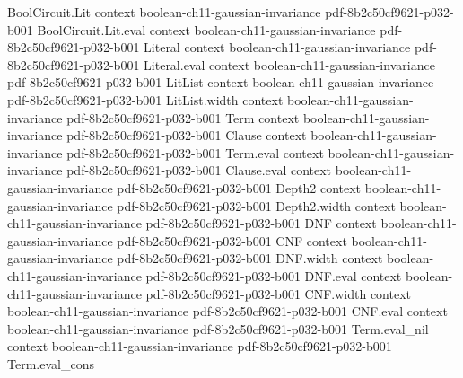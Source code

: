 \begin{lemma}
\leanok
{}
\proofstep
  {BoolCircuit.Lit}
  {context}
  {boolean-ch11-gaussian-invariance}
  {pdf-8b2c50cf9621-p032-b001}
\proofstep
  {BoolCircuit.Lit.eval}
  {context}
  {boolean-ch11-gaussian-invariance}
  {pdf-8b2c50cf9621-p032-b001}
\proofstep
  {Literal}
  {context}
  {boolean-ch11-gaussian-invariance}
  {pdf-8b2c50cf9621-p032-b001}
\proofstep
  {Literal.eval}
  {context}
  {boolean-ch11-gaussian-invariance}
  {pdf-8b2c50cf9621-p032-b001}
\proofstep
  {LitList}
  {context}
  {boolean-ch11-gaussian-invariance}
  {pdf-8b2c50cf9621-p032-b001}
\proofstep
  {LitList.width}
  {context}
  {boolean-ch11-gaussian-invariance}
  {pdf-8b2c50cf9621-p032-b001}
\proofstep
  {Term}
  {context}
  {boolean-ch11-gaussian-invariance}
  {pdf-8b2c50cf9621-p032-b001}
\proofstep
  {Clause}
  {context}
  {boolean-ch11-gaussian-invariance}
  {pdf-8b2c50cf9621-p032-b001}
\proofstep
  {Term.eval}
  {context}
  {boolean-ch11-gaussian-invariance}
  {pdf-8b2c50cf9621-p032-b001}
\proofstep
  {Clause.eval}
  {context}
  {boolean-ch11-gaussian-invariance}
  {pdf-8b2c50cf9621-p032-b001}
\proofstep
  {Depth2}
  {context}
  {boolean-ch11-gaussian-invariance}
  {pdf-8b2c50cf9621-p032-b001}
\proofstep
  {Depth2.width}
  {context}
  {boolean-ch11-gaussian-invariance}
  {pdf-8b2c50cf9621-p032-b001}
\proofstep
  {DNF}
  {context}
  {boolean-ch11-gaussian-invariance}
  {pdf-8b2c50cf9621-p032-b001}
\proofstep
  {CNF}
  {context}
  {boolean-ch11-gaussian-invariance}
  {pdf-8b2c50cf9621-p032-b001}
\proofstep
  {DNF.width}
  {context}
  {boolean-ch11-gaussian-invariance}
  {pdf-8b2c50cf9621-p032-b001}
\proofstep
  {DNF.eval}
  {context}
  {boolean-ch11-gaussian-invariance}
  {pdf-8b2c50cf9621-p032-b001}
\proofstep
  {CNF.width}
  {context}
  {boolean-ch11-gaussian-invariance}
  {pdf-8b2c50cf9621-p032-b001}
\proofstep
  {CNF.eval}
  {context}
  {boolean-ch11-gaussian-invariance}
  {pdf-8b2c50cf9621-p032-b001}
\proofstep
  {Term.eval_nil}
  {context}
  {boolean-ch11-gaussian-invariance}
  {pdf-8b2c50cf9621-p032-b001}
\proofstep
  {Term.eval_cons}

\end{lemma}
